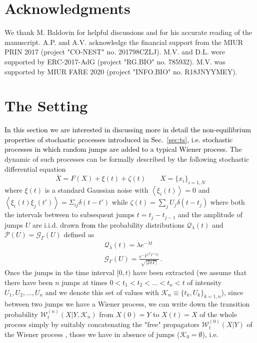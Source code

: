 \documentclass[12pt]{iopart}
\newcommand{\lx} {\left}
\newcommand{\rx} {\right}
\newcommand{\ave}[1] {\lx\langle #1 \rx\rangle}
\newcommand{\cP} {\mathcal{P}}
\newcommand{\cW} {\mathcal{W}}
\newcommand{\cG} {\mathcal{G}}
\newcommand{\cK} {\mathcal{K}}
\newcommand{\cQ} {\mathcal{Q}}
\begin{document}
\label{sec:concl}
\section*{Acknowledgments}
We thank M. Baldovin for helpful discussions and for his accurate reading of the manuscript. A.P. and A.V. acknowledge the financial support from the MIUR PRIN 2017 (project "CO-NEST" no. 201798CZLJ). M.V. and D.L. were supported by ERC-2017-AdG (project "RG.BIO" no. 785932). M.V. was supported by MIUR FARE 2020 (project "INFO.BIO" no. R18JNYYMEY).

\appendix
\section{The Setting}\label{app:Setting}
\textcolor{black}{In this section we are interested in discussing more in detail the non-equilibrium properties of stochastic processes introduced in Sec.~\ref{sec:ts}, i.e. stochastic processes in which random jumps are added to a typical Wiener process.} 
The dynamic of such processes can be formally described by the following stochastic differential equation
\begin{equation}
    \dot{X} = F(X) + \xi(t) + \zeta(t) \qquad X=\{x_i\}_{i=1,N}
\end{equation}
where $\xi(t)$ is a standard Gaussian noise with $\ave{\xi_i(t)}=0$ and $\ave{\xi_i(t)\xi_j(t')}=\Sigma_{ij}\delta(t-t')$ while $\zeta(t)=\sum_j U_j \delta(t-t_j)$ where both the intervals between to subsequent jumps $t=t_{j}-t_{j-1}$ and the amplitude of jumps $U$ are i.i.d. drawn \textcolor{black}{from} the probability distributions $\cQ_\lambda(t)$ and $\cP(U)=\cG_\Gamma(U)$ defined as
\begin{eqnarray}
    &\cQ_\lambda(t) = \lambda e^{-\lambda t}\\
    & \cG_\Gamma(U) = \frac{e^{-\frac{1}{2}U^T\Gamma^{-1}U}}{\sqrt{|2\pi\Gamma|}}\,.
\end{eqnarray}
Once the jumps in the time interval $[0,t)$ have been extracted (we assume that there have been $n$ jumps at times $0<t_1<t_2<\dots<t_n<t$ of intensity $U_1,U_2,\dots,U_n$ and we denote this set of values with $\cK_n\equiv \{t_k,U_k\}_{k=1,n}$), since between two jumps we have a Wiener process, we can write down the transition probability $\cW^{(n)}_t(X|Y,\cK_n)$ from $X(0)=Y$ to $X(t)=X$ of the whole process simply by suitably concatenating the "free" propagators $\cW^{(0)}_t(X|Y)$ of the Wiener process , those we have in absence of jumps ($\cK_0=\emptyset$), i.e. 
\end{document}
